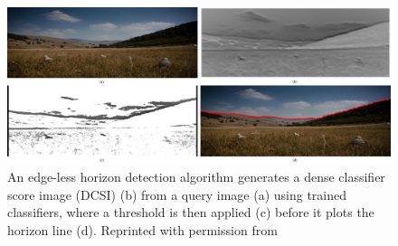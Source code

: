 \begin{figure}[H]
	\centering
	\includegraphics[width=\linewidth]{edgeless}
	\caption[Edge-less horizon detection]{\label{fig:edgeless}An edge-less horizon detection algorithm generates a dense classifier score image (DCSI) (b) from a query image (a) using trained classifiers, where a threshold is then applied (c) before it plots the horizon line (d). Reprinted with permission from~\cite{t._ahmad_edge-less_2015}}
\end{figure}


